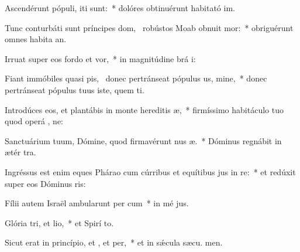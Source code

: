 \item Ascendérunt pópuli,  iti sunt:~* dolóres obtinuérunt habitató im.
\item Tunc conturbáti sunt príncipes dom,~\pscross{} robústos Moab obnuit mor:~* obriguérunt omnes habita an.
\item Irruat super eos fordo et vor,~* in magnitúdine brá i:
\item Fiant immóbiles quasi pis,~\pscross{} donec pertránseat pópulus us, mine,~* donec pertránseat pópulus tuus iste, quem ti.
\item Introdúces eos, et plantábis in monte hereditis æ,~* firmíssimo habitáculo tuo quod operá , ne:
\item Sanctuárium tuum, Dómine, quod firmavérunt nus æ.~* Dóminus regnábit in ætér  tra.
\item Ingréssus est enim eques Phárao cum cúrribus et equítibus jus in re:~* et redúxit super eos Dóminus  ris:
\item Fílii autem Israël ambularunt per cum~* in mé jus.
\item Glória tri, et lio,~* et Spirí to.
\item Sicut erat in princípio, et , et per,~* et in sǽcula sæcu. men.
